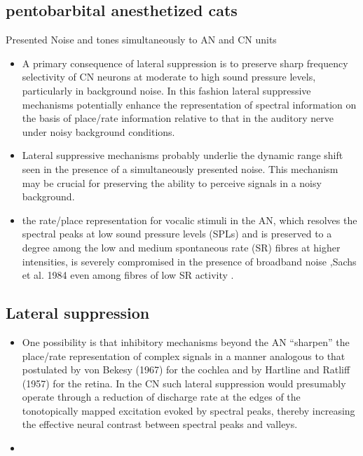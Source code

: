 \documentclass[10pt,a4paper]{article}
\begin{document}
\subsection{\citep{RhodeGreenberg:1994a} pentobarbital anesthetized cats}

Presented Noise and tones simultaneously to AN and CN units


\begin{itemize}
\item A primary consequence of lateral suppression is to preserve sharp
  frequency selectivity of CN neurons at moderate to high sound pressure levels,
  particularly in background noise. In this fashion lateral suppressive
  mechanisms potentially enhance the representation of spectral information on
  the basis of place/rate information relative to that in the auditory nerve
  under noisy background conditions.
\item Lateral suppressive mechanisms probably underlie the dynamic range shift
  seen in the presence of a simultaneously presented noise. This mechanism may
  be crucial for preserving the ability to perceive signals in a noisy
  background.
\item the rate/place representation for vocalic stimuli in the AN, which
  resolves the spectral peaks at low sound pressure levels (SPLs) and is
  preserved to a degree among the low and medium spontaneous rate (SR) fibres at
  higher intensities, is severely compromised in the presence of broadband noise
  \citep{GeislerGamble:1989} ,Sachs et al. 1984 even among fibres of low SR
  activity \citep{SachsVoigtEtAl:1983,MillerSachs:1984,SilkesGeisler:1991}.
\end{itemize}

\subsection{Lateral suppression}


\begin{itemize}
\item One possibility is that inhibitory mechanisms beyond the AN
  {\textquotedblleft}sharpen{\textquotedblright} the place/rate representation
  of complex signals in a manner analogous to that postulated by von Bekesy
  (1967) for the cochlea and by Hartline and Ratliff (1957) for the retina. In
  the CN such lateral suppression would presumably operate through a reduction
  of discharge rate at the edges of the tonotopically mapped excitation evoked
  by spectral peaks, thereby increasing the effective neural contrast between
  spectral peaks and valleys.
\item \end{itemize}
\end{document}
